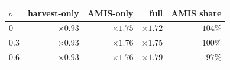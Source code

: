 \begin{tabular}{l rrrr}
\toprule
\(\sigma\) & harvest-only & AMIS-only & full & AMIS share \\
\midrule
0   & $\times 0.93$ & $\times 1.75$ & $\times 1.72$ & $104\%$ \\
0.3 & $\times 0.93$ & $\times 1.76$ & $\times 1.75$ & $100\%$ \\
0.6 & $\times 0.93$ & $\times 1.76$ & $\times 1.79$ & $97\%$ \\
\bottomrule
\end{tabular}
